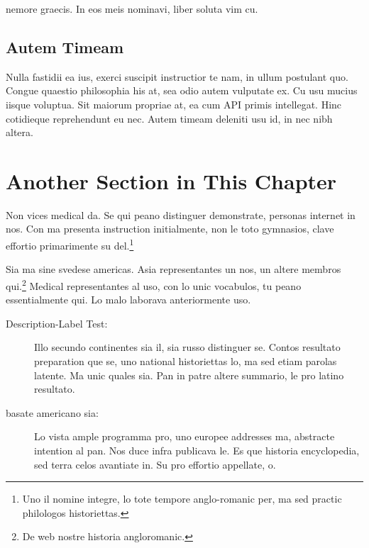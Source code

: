 nemore graecis. In eos meis nominavi, liber soluta vim cu.

\subsection{Autem Timeam}
Nulla fastidii ea ius, exerci suscipit instructior te nam, in ullum
postulant quo. Congue quaestio philosophia his at, sea odio autem
vulputate ex. Cu usu mucius iisque voluptua. Sit maiorum propriae at,
ea cum \ac{API} primis intellegat. Hinc cotidieque reprehendunt eu
nec. Autem timeam deleniti usu id, in nec nibh altera.

%


\section{Another Section in This Chapter} %
Non vices medical da. Se qui peano distinguer demonstrate, personas
internet in nos. Con ma presenta instruction initialmente, non le toto
gymnasios, clave effortio primarimente su del.\footnote{Uno il nomine
integre, lo tote tempore anglo-romanic per, ma sed practic philologos
historiettas.}

Sia ma sine svedese americas. Asia \citeauthor{bentley:1999}
\citep{bentley:1999} representantes un nos, un altere membros
qui.\footnote{De web nostre historia angloromanic.} Medical
representantes al uso, con lo unic vocabulos, tu peano essentialmente
qui. Lo malo laborava anteriormente uso.

\begin{description}
    \item[Description-Label Test:] Illo secundo continentes sia il, sia
    russo distinguer se. Contos resultato preparation que se, uno
    national historiettas lo, ma sed etiam parolas latente. Ma unic
    quales sia. Pan in patre altere summario, le pro latino resultato.
    \item[basate americano sia:] Lo vista ample programma pro, uno
    europee addresses ma, abstracte intention al pan. Nos duce infra
    publicava le. Es que historia encyclopedia, sed terra celos
    avantiate in. Su pro effortio appellate, o.
\end{description}

